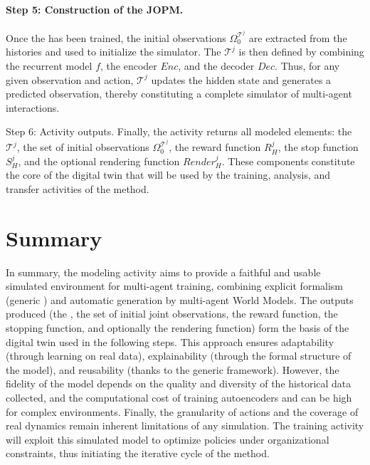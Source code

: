 \paragraph{Step 5: Construction of the JOPM.}
Once the  has been trained, the initial observations $\Omega^{\mathcal {T}^j}_0$ are extracted from the histories and used to initialize the simulator.
The  $\mathcal{T}^j$ is then defined by combining the recurrent model $f$, the encoder $Enc$, and the decoder $Dec$.
Thus, for any given observation and action, $\mathcal{T}^j$ updates the hidden state and generates a predicted observation, thereby constituting a complete simulator of multi-agent interactions.

Step 6: Activity outputs.
Finally, the activity returns all modeled elements: the  $\mathcal{T}^j$, the set of initial observations $\Omega^{\mathcal{T}^j}_0$, the reward function $R^j_H$, the stop function $S^j_H$, and the optional rendering function $Render^j_H$.
These components constitute the core of the digital twin that will be used by the training, analysis, and transfer activities of the  method.


\section{Summary}

\noindent
In summary, the modeling activity aims to provide a faithful and usable simulated environment for multi-agent training, combining explicit formalism (generic ) and automatic generation by multi-agent World Models. The outputs produced (the , the set of initial joint observations, the reward function, the stopping function, and optionally the rendering function) form the basis of the digital twin used in the following steps. This approach ensures adaptability (through learning on real data), explainability (through the formal structure of the model), and reusability (thanks to the generic framework). However, the fidelity of the model depends on the quality and diversity of the historical data collected, and the computational cost of training autoencoders and  can be high for complex environments. Finally, the granularity of actions and the coverage of real dynamics remain inherent limitations of any simulation. The training activity will exploit this simulated model to optimize policies under organizational constraints, thus initiating the iterative cycle of the  method.

